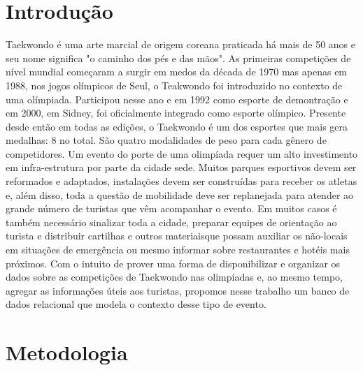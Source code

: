 \documentclass[10pt]{article}
\begin{document}
\begin{multicols}{2}

\section{Introdução}
Taekwondo é uma arte marcial de origem coreana praticada há mais de 50 anos e seu nome significa "o caminho dos pés e das mãos". As primeiras competições de nível mundial começaram a surgir em medos da década de 1970 mas apenas em 1988, nos jogos olímpicos de Seul, o Teakwondo foi introduzido no contexto de uma olímpiada. Participou nesse ano e em 1992 como esporte de demontração e em 2000, em Sidney, foi oficialmente integrado como esporte olímpico. Presente desde então em todas as edições, o Taekwondo é um dos esportes que mais gera medalhas: 8 no total. São quatro modalidades de peso para cada gênero de competidores. Um evento do porte de uma olimpíada requer um alto investimento em infra-estrutura por parte da cidade sede. Muitos parques esportivos devem ser reformados e adaptados, instalações devem ser construídas para receber os atletas e, além disso, toda a questão de mobilidade deve ser replanejada para atender ao grande número de turistas que vêm acompanhar o evento.  Em muitos casos é também necessário sinalizar toda a cidade,  preparar equipes de orientação ao turista e distribuir cartilhas e outros materiaisque possam auxiliar os não-locais em situações de emergência ou mesmo informar sobre restaurantes e hotéis mais próximos. Com o intuito de prover uma forma de disponibilizar e organizar os dados sobre as competições de Taekwondo nas olimpíadas e, ao mesmo tempo, agregar as informações úteis aos turistas, propomos nesse trabalho um banco de dados relacional que modela o contexto desse tipo de evento.

\section{Metodologia}

\end{multicols}
\end{document}
